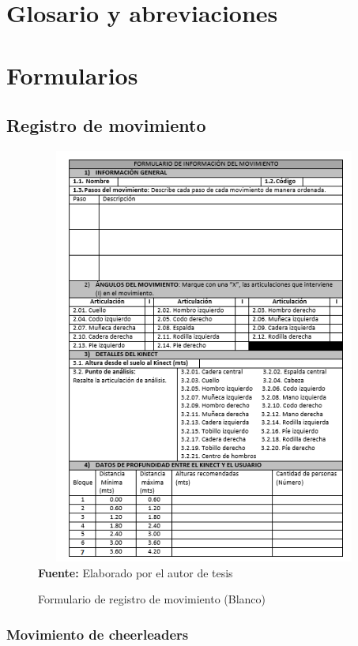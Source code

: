 \appendix
\renewcommand{\thesection}{A.\arabic{section}}
\renewcommand{\thesubsection}{A.\arabic{section}.\arabic{subsection}}
\renewcommand{\thesubsubsection}{A.\arabic{section}.\arabic{subsection}.\arabic{subsubsection}}
\renewcommand\thefigure{A.\arabic{section}.\arabic{figure}}   
\appendixpage
\addappheadtotoc
\section{Glosario y abreviaciones}
\printglossary
\printglossary[type=\acronymtype, title=Abreviaciones]
\section{Formularios}
\subsection{Registro de movimiento}
\begin{figure}[H]
	\caption{Formulario de  registro de movimiento (Blanco)}
	\label{fig:frmWhiteMov}
	\centering
	\includegraphics[width=420px,height=520px]{graphics/frm-mov.PNG} \\
	\textbf{Fuente:} Elaborado por el autor de tesis
\end{figure}
\subsubsection{Movimiento de cheerleaders}
